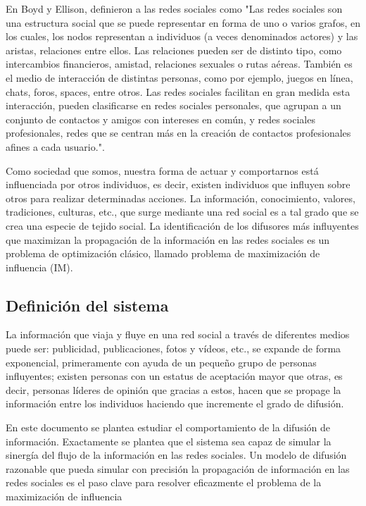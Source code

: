 \documentclass{article}
\begin{document}
 En Boyd y Ellison, definieron a las redes sociales como "Las redes sociales son una estructura social que se puede representar en forma de uno o varios grafos, en los cuales, los nodos representan a individuos (a veces denominados actores) y las aristas, relaciones entre ellos. Las relaciones pueden ser de distinto tipo, como intercambios financieros, amistad, relaciones sexuales o rutas aéreas. También es el medio de interacción de distintas personas, como por ejemplo, juegos en línea, chats, foros, spaces, entre otros. Las redes sociales facilitan en gran medida esta interacción, pueden clasificarse en redes sociales personales, que agrupan a un conjunto de contactos y amigos con intereses en común, y redes sociales profesionales, redes que se centran más en la creación de contactos profesionales afines a cada usuario."\cite{definition:redsocial}. 
 
 Como sociedad que somos, nuestra forma de actuar y comportarnos está influenciada por otros individuos, es decir, existen individuos que influyen sobre otros para realizar determinadas acciones. La información, conocimiento, valores, tradiciones, culturas, etc., que surge mediante una red social es a tal grado que se crea una especie de tejido social. La identificación de los difusores más influyentes que maximizan la propagación de la información en las redes sociales es un problema de optimización clásico, llamado problema de maximización de influencia (IM).
   
 \subsection{Definición del sistema}
La información que viaja y fluye en una red social a través de diferentes medios puede ser: publicidad, publicaciones, fotos y vídeos, etc., se expande de forma exponencial, primeramente con ayuda de un pequeño grupo de personas influyentes; existen personas con un estatus de aceptación mayor que otras, es decir, personas líderes de opinión que gracias a estos, hacen que se propage la información entre los individuos haciendo que incremente el grado de difusión.

En este documento se plantea estudiar el comportamiento de la difusión de información. Exactamente se plantea que el sistema sea capaz de simular la sinergía del flujo de la información en las redes sociales. Un modelo de difusión razonable que pueda simular con precisión la propagación de información en las redes sociales es el paso clave para resolver eficazmente el problema de la maximización de influencia
 
\end{document}
